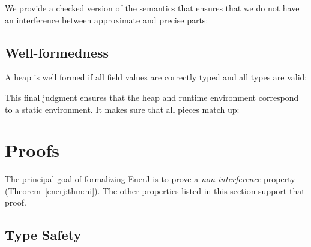 \vspace{0.5ex}
\ottdefnsemanticsXXprg{}
\vspace{2.0ex}


We provide a checked version of the semantics that ensures that we do
not have an interference between approximate and precise parts:

\vspace{0.5ex}
\ottdefncheckedsemantics{}
\vspace{2.0ex}


\subsection{Well-formedness}

A heap is well formed if all field values are correctly typed and all
types are valid:

\vspace{0.5ex}
\ottdefnwfheap{}
\vspace{2.0ex}


This final judgment ensures that the heap and runtime environment
correspond to a static environment.
It makes sure that all pieces match up:

\vspace{0.5ex}
\ottdefnwfenvs{}
\vspace{2.0ex}



\section{Proofs}
\label{enerj:proofs}

The principal goal of formalizing EnerJ is to prove a \emph{non-interference}
property (Theorem~\ref{enerj:thm:ni}). The other properties listed in this section
support that proof.


\subsection{Type Safety}

